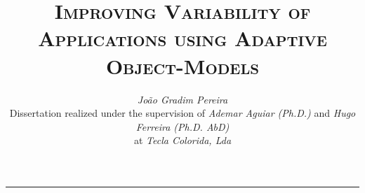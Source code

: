 \documentclass[9pt,a4paper]{extarticle}
\begin{document}
\title{\vspace*{-8mm}\textbf{\textsc{Improving Variability of Applications using Adaptive Object-Models}}}
\author{\emph{João Gradim Pereira}\\[2mm]
\small{Dissertation realized under the supervision of \emph{Ademar Aguiar (Ph.D.)} and \emph{Hugo Ferreira (Ph.D. AbD)}}\\
\small{at \emph{Tecla Colorida, Lda}}}
\date{}
\maketitle
\thispagestyle{empty}

\vspace*{-4mm}\noindent\rule{\textwidth}{0.4pt}\vspace*{4mm}
\end{document}
